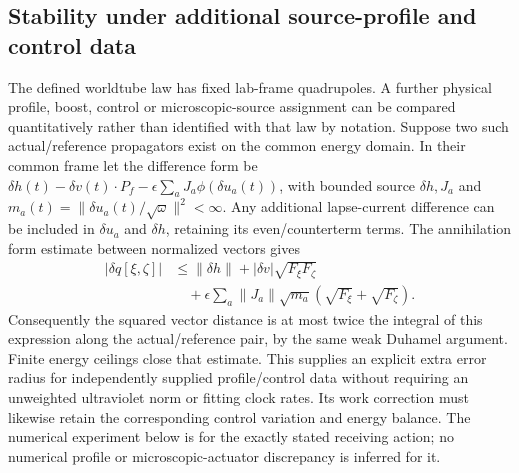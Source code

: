 \subsection{Stability under additional source-profile and control data}
The defined worldtube law has fixed lab-frame quadrupoles. A further
physical profile, boost, control or microscopic-source assignment can be
compared quantitatively rather than identified with that law by notation.
Suppose two such actual/reference propagators exist on the common energy
domain. In their common frame let the difference form be
\(\delta h(t)-\delta v(t)\cdot P_f
 -\epsilon\sum_a J_a\phi(\delta u_a(t))\), with bounded source
\(\delta h,J_a\) and
\(m_a(t)=\|\delta u_a(t)/\sqrt\omega\|^2<\infty\).
Any additional lapse-current difference can be included in \(\delta u_a\)
and \(\delta h\), retaining its even/counterterm terms. The annihilation
form estimate between normalized vectors gives
\[
 \begin{aligned}|\delta q[\xi,\zeta]|&\leq\|\delta h\|
 +|\delta v|\sqrt{F_\xi F_\zeta}
 \\ &\quad+\epsilon\sum_a\|J_a\|\sqrt{m_a}
            (\sqrt{F_\xi}+\sqrt{F_\zeta}).\end{aligned}
\]
Consequently the squared vector distance is at most twice the integral
of this expression along the actual/reference pair, by the same weak
Duhamel argument. Finite energy ceilings close that estimate. This
supplies an explicit extra error radius for independently supplied
profile/control data without requiring an unweighted ultraviolet norm
or fitting clock rates. Its work correction must likewise retain the
corresponding control variation and energy balance. The numerical
experiment below is for the exactly stated receiving action; no numerical
profile or microscopic-actuator discrepancy is inferred for it.

